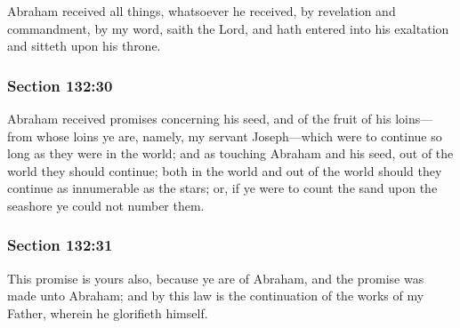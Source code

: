 		Abraham received all things, whatsoever he received, by revelation and commandment, by my word, saith the Lord, and hath entered into his exaltation and sitteth upon his throne.


	\subsubsection{Section 132:30} %
		\label{DC132-30}

		Abraham received promises concerning his seed, and of the fruit of his loins---from whose loins ye are, namely, my servant Joseph---which were to continue so long as they were in the world; and as touching Abraham and his seed, out of the world they should continue; both in the world and out of the world should they continue as innumerable as the stars; or, if ye were to count the sand upon the seashore ye could not number them.


	\subsubsection{Section 132:31} %
		\label{DC132-31}

		This promise is yours also, because ye are of Abraham, and the promise was made unto Abraham; and by this law is the continuation of the works of my Father, wherein he glorifieth himself.


